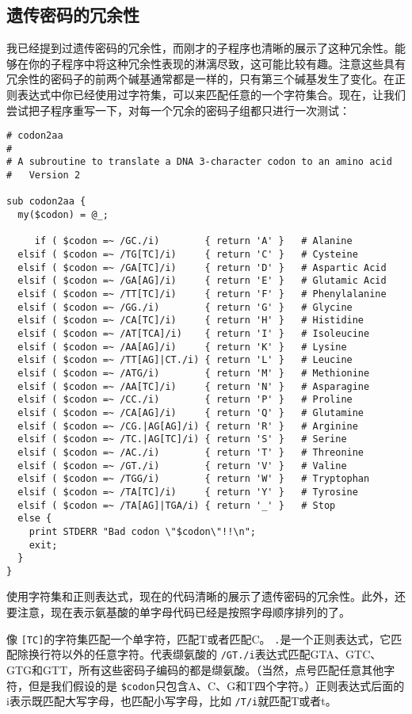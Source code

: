 \subsection{遗传密码的冗余性}
我已经提到过遗传密码的冗余性，而刚才的子程序也清晰的展示了这种冗余性。能够在你的子程序中将这种冗余性表现的淋漓尽致，这可能比较有趣。注意这些具有冗余性的密码子的前两个碱基通常都是一样的，只有第三个碱基发生了变化。在正则表达式中你已经使用过字符集，可以来匹配任意的一个字符集合。现在，让我们尝试把子程序重写一下，对每一个冗余的密码子组都只进行一次测试：

\begin{lstlisting}
# codon2aa
#
# A subroutine to translate a DNA 3-character codon to an amino acid
#   Version 2

sub codon2aa {
  my($codon) = @_;
 
     if ( $codon =~ /GC./i)        { return 'A' }   # Alanine
  elsif ( $codon =~ /TG[TC]/i)     { return 'C' }   # Cysteine
  elsif ( $codon =~ /GA[TC]/i)     { return 'D' }   # Aspartic Acid
  elsif ( $codon =~ /GA[AG]/i)     { return 'E' }   # Glutamic Acid
  elsif ( $codon =~ /TT[TC]/i)     { return 'F' }   # Phenylalanine
  elsif ( $codon =~ /GG./i)        { return 'G' }   # Glycine
  elsif ( $codon =~ /CA[TC]/i)     { return 'H' }   # Histidine
  elsif ( $codon =~ /AT[TCA]/i)    { return 'I' }   # Isoleucine
  elsif ( $codon =~ /AA[AG]/i)     { return 'K' }   # Lysine
  elsif ( $codon =~ /TT[AG]|CT./i) { return 'L' }   # Leucine
  elsif ( $codon =~ /ATG/i)        { return 'M' }   # Methionine
  elsif ( $codon =~ /AA[TC]/i)     { return 'N' }   # Asparagine
  elsif ( $codon =~ /CC./i)        { return 'P' }   # Proline
  elsif ( $codon =~ /CA[AG]/i)     { return 'Q' }   # Glutamine
  elsif ( $codon =~ /CG.|AG[AG]/i) { return 'R' }   # Arginine
  elsif ( $codon =~ /TC.|AG[TC]/i) { return 'S' }   # Serine
  elsif ( $codon =~ /AC./i)        { return 'T' }   # Threonine
  elsif ( $codon =~ /GT./i)        { return 'V' }   # Valine
  elsif ( $codon =~ /TGG/i)        { return 'W' }   # Tryptophan
  elsif ( $codon =~ /TA[TC]/i)     { return 'Y' }   # Tyrosine
  elsif ( $codon =~ /TA[AG]|TGA/i) { return '_' }   # Stop
  else {
    print STDERR "Bad codon \"$codon\"!!\n";
    exit;
  }
}
\end{lstlisting}

使用字符集和正则表达式，现在的代码清晰的展示了遗传密码的冗余性。此外，还要注意，现在表示氨基酸的单字母代码已经是按照字母顺序排列的了。

像 \verb|[TC]|的字符集匹配一个单字符，匹配T或者匹配C。 \verb|.|是一个正则表达式，它匹配除换行符以外的任意字符。代表缬氨酸的 \verb|/GT./i|表达式匹配GTA、GTC、GTG和GTT，所有这些密码子编码的都是缬氨酸。（当然，点号匹配任意其他字符，但是我们假设的是 \verb|$codon|只包含A、C、G和T四个字符。）正则表达式后面的i表示既匹配大写字母，也匹配小写字母，比如 \verb|/T/i|就匹配T或者t。

